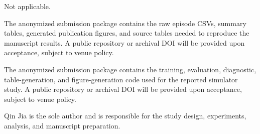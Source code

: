 \documentclass[pdflatex,sn-mathphys-ay]{sn-jnl}
\begin{document}
Not applicable.

The anonymized submission package contains the raw episode CSVs, summary tables, generated publication figures, and source tables needed to reproduce the manuscript results. A public repository or archival DOI will be provided upon acceptance, subject to venue policy.

The anonymized submission package contains the training, evaluation, diagnostic, table-generation, and figure-generation code used for the reported simulator study. A public repository or archival DOI will be provided upon acceptance, subject to venue policy.

Qin Jia is the sole author and is responsible for the study design, experiments, analysis, and manuscript preparation.
\end{document}
